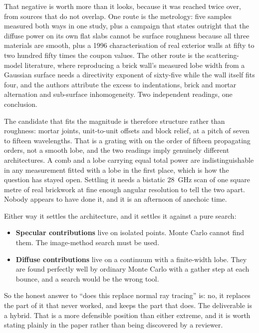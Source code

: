 \documentclass[11pt,a4paper]{article}
\begin{document}
That negative is worth more than it looks, because it was reached twice over,
from sources that do not overlap. One route is the metrology: five samples
measured both ways in one study, plus a campaign that states outright that the
diffuse power on its own flat slabs cannot be surface roughness because all three
materials are smooth, plus a 1996 characterisation of real exterior walls at
fifty to two hundred fifty times the coupon values. The other route is the
scattering-model literature, where reproducing a brick wall's measured lobe width
from a Gaussian surface needs a directivity exponent of sixty-five while the wall
itself fits four, and the authors attribute the excess to indentations, brick and
mortar alternation and sub-surface inhomogeneity. Two independent readings, one
conclusion.

The candidate that fits the magnitude is therefore structure rather than
roughness: mortar joints, unit-to-unit offsets and block relief, at a pitch of
seven to fifteen wavelengths. That is a grating with on the order of fifteen
propagating orders, not a smooth lobe, and the two readings imply genuinely
different architectures.
A comb and a lobe carrying equal total power are indistinguishable in any
measurement fitted with a lobe in the first place, which is how the question has
stayed open. Settling it needs a bistatic $28$~GHz scan of one square metre of
real brickwork at fine enough angular resolution to tell the two apart. Nobody
appears to have done it, and it is an afternoon of anechoic time.

Either way it settles the architecture, and it settles it against a pure search:

\begin{itemize}
\item \textbf{Specular contributions} live on isolated points. Monte Carlo cannot
      find them. The image-method search must be used.
\item \textbf{Diffuse contributions} live on a continuum with a finite-width lobe.
      They are found perfectly well by ordinary Monte Carlo with a gather step at
      each bounce, and a search would be the wrong tool.
\end{itemize}

So the honest answer to ``does this replace normal ray tracing'' is: no, it
replaces the part of it that never worked, and keeps the part that does. The
deliverable is a hybrid. That is a more defensible position than either extreme,
and it is worth stating plainly in the paper rather than being discovered by a
reviewer.
\end{document}
